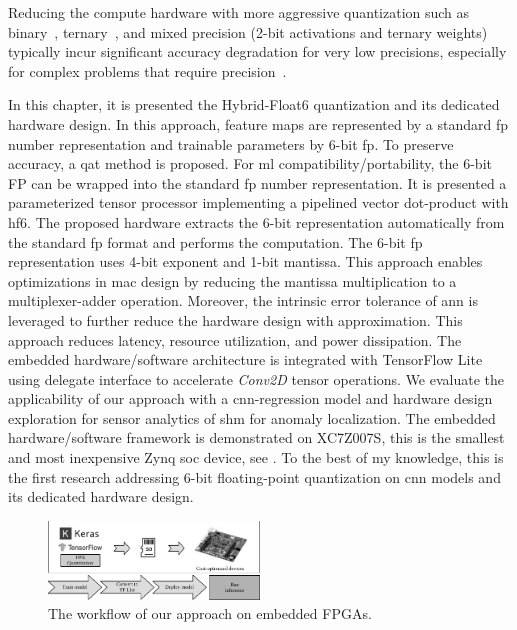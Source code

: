 Reducing the compute hardware with more aggressive quantization such as binary~\cite{courbariaux2015binaryconnect}, ternary~\cite{lin2015neural}, and mixed precision (2-bit activations and ternary weights)~\cite{colangelo2018exploration} typically incur significant accuracy degradation for very low precisions, especially for complex problems that require precision~\cite{faraone2019addnet}.

In this chapter, it is presented the Hybrid-Float6 quantization and its dedicated hardware design. In this approach, feature maps are represented by a standard \gls{fp} number representation and trainable parameters by 6-bit \gls{fp}. To preserve accuracy, a \gls{qat} method is proposed. For \gls{ml} compatibility/portability, the 6-bit FP can be wrapped into the standard \gls{fp} number representation. It is presented a parameterized tensor processor implementing a pipelined vector dot-product with \gls{hf6}. The proposed hardware extracts the 6-bit representation automatically from the standard \gls{fp} format and performs the computation. The 6-bit \gls{fp} representation uses 4-bit exponent and 1-bit mantissa. This approach enables optimizations in \gls{mac} design by reducing the mantissa multiplication to a multiplexer-adder operation. Moreover, the intrinsic error tolerance of \gls{ann} is leveraged to further reduce the hardware design with approximation. This approach reduces latency, resource utilization, and power dissipation. The embedded hardware/software architecture is integrated with TensorFlow Lite using delegate interface to accelerate \emph{Conv2D} tensor operations. We evaluate the applicability of our approach with a \gls{cnn}-regression model and hardware design exploration for sensor analytics of \gls{shm} for anomaly localization. The embedded hardware/software framework is demonstrated on XC7Z007S, this is the smallest and most inexpensive Zynq \gls{soc} device, see . To the best of my knowledge, this is the first research addressing 6-bit floating-point quantization on \gls{cnn} models and its dedicated hardware design.

\begin{figure}[t!]
	\centering
	\includegraphics[width=0.5\textwidth]{./chapters/cnn_accelerator/figures/workflow.pdf}
	\caption{The workflow of our approach on embedded FPGAs.}
	\label{fig:workflow}
\end{figure}

